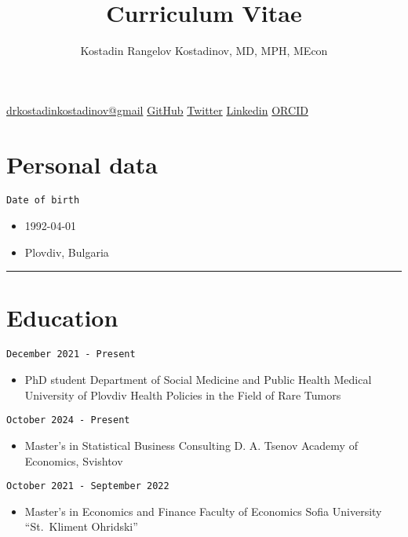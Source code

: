 \documentclass[
  12pt,
  letterpaper,
  DIV=11,
  numbers=noendperiod]{scrartcl}
\title{Curriculum Vitae}
\author{Kostadin Rangelov Kostadinov, MD, MPH, MEcon}
\date{}
\providecommand{\tightlist}{%
  \setlength{\itemsep}{0pt}\setlength{\parskip}{0pt}}\usepackage{longtable,booktabs,array}
\begin{document}
\maketitle


\href{https://drkostadinkostadinov@gmail.com}{drkostadinkostadinov@gmail}
\textbar{} \href{https://github.com/kostadinoff}{GitHub} \textbar{}
\href{https://twitter.com/kostadinoffMD}{Twitter} \textbar{}
\href{https://linkedin.com/in/kostadinovmd}{Linkedin} \textbar{}
\href{https://orcid.org/0000-0003-1414-8738}{ORCID}

\section{Personal data}\label{personal-data}

\texttt{Date\ of\ birth}

\begin{itemize}
\tightlist
\item
  1992-04-01
\item
  Plovdiv, Bulgaria
\end{itemize}

\begin{center}\rule{0.5\linewidth}{0.5pt}\end{center}

\section{Education}\label{education}

\texttt{December\ 2021\ -\ Present}

\begin{itemize}
\tightlist
\item
  PhD student \textbar{} Department of Social Medicine and Public Health
  \textbar{} Medical University of Plovdiv \textbar{} Health Policies in
  the Field of Rare Tumors
\end{itemize}

\texttt{October\ 2024\ -\ Present}

\begin{itemize}
\tightlist
\item
  Master's in Statistical Business Consulting \textbar{} D. A. Tsenov
  Academy of Economics, Svishtov
\end{itemize}

\texttt{October\ 2021\ -\ September\ 2022}

\begin{itemize}
\tightlist
\item
  Master's in Economics and Finance \textbar{} Faculty of Economics
  \textbar{} Sofia University ``St.~Kliment Ohridski''
\end{itemize}
\end{document}
